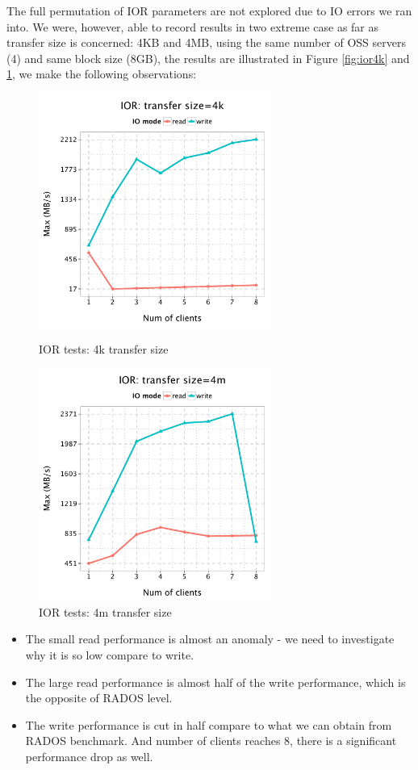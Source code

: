 \documentclass{article}
\begin{document}
The full permutation of IOR parameters are not explored due to IO errors we ran
into. We were, however, able to record results in two extreme case as far as
transfer size is concerned: 4KB and 4MB, using the same number of OSS servers
(4) and same block size (8GB), the results are illustrated in Figure
\ref{fig:ior4k} and \ref{fig:ior4m}, we make the following observations:


\begin{figure}[H]
\centering
\begin{minipage}[t]{0.5\linewidth}
\centering
\includegraphics[width=3in]{data/ior_4k}
\caption{IOR tests: 4k transfer size}
\label{fig:ior4k}
\end{minipage}%
\begin{minipage}[t]{0.5\linewidth}
\centering
\includegraphics[width=3in]{data/ior_4m}
\caption{IOR tests: 4m transfer size}
\label{fig:ior4m}
\end{minipage}%
\end{figure}


\begin{itemize}
  \item The small read performance is almost an anomaly - we need to
  investigate why it is so low compare to write.
  \item The large read performance is almost half of the write performance,
  which is the opposite of RADOS level. 
  \item The write performance is cut in half compare to what we can obtain from
  RADOS benchmark. And number of clients reaches 8, there is a significant
  performance drop as well. 
\end{itemize}
\end{document}
